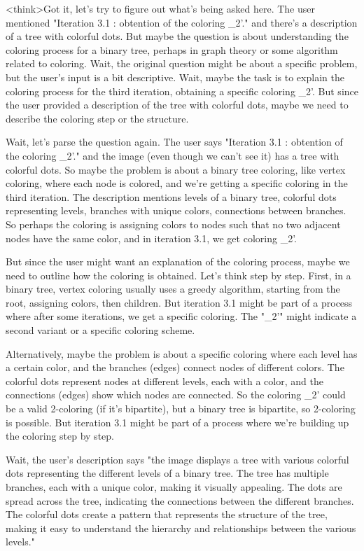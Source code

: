 <think>Got it, let's try to figure out what's being asked here. The user mentioned "Iteration 3.1 : obtention of the coloring _2'." and there's a description of a tree with colorful dots. But maybe the question is about understanding the coloring process for a binary tree, perhaps in graph theory or some algorithm related to coloring. Wait, the original question might be about a specific problem, but the user's input is a bit descriptive. Wait, maybe the task is to explain the coloring process for the third iteration, obtaining a specific coloring _2'. But since the user provided a description of the tree with colorful dots, maybe we need to describe the coloring step or the structure.

Wait, let's parse the question again. The user says "Iteration 3.1 : obtention of the coloring _2'." and the image (even though we can't see it) has a tree with colorful dots. So maybe the problem is about a binary tree coloring, like vertex coloring, where each node is colored, and we're getting a specific coloring in the third iteration. The description mentions levels of a binary tree, colorful dots representing levels, branches with unique colors, connections between branches. So perhaps the coloring is assigning colors to nodes such that no two adjacent nodes have the same color, and in iteration 3.1, we get coloring _2'.

But since the user might want an explanation of the coloring process, maybe we need to outline how the coloring is obtained. Let's think step by step. First, in a binary tree, vertex coloring usually uses a greedy algorithm, starting from the root, assigning colors, then children. But iteration 3.1 might be part of a process where after some iterations, we get a specific coloring. The "_2'" might indicate a second variant or a specific coloring scheme.

Alternatively, maybe the problem is about a specific coloring where each level has a certain color, and the branches (edges) connect nodes of different colors. The colorful dots represent nodes at different levels, each with a color, and the connections (edges) show which nodes are connected. So the coloring _2' could be a valid 2-coloring (if it's bipartite), but a binary tree is bipartite, so 2-coloring is possible. But iteration 3.1 might be part of a process where we're building up the coloring step by step.

Wait, the user's description says "the image displays a tree with various colorful dots representing the different levels of a binary tree. The tree has multiple branches, each with a unique color, making it visually appealing. The dots are spread across the tree, indicating the connections between the different branches. The colorful dots create a pattern that represents the structure of the tree, making it easy to understand the hierarchy and relationships between the various levels."

